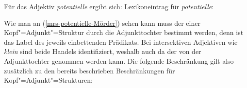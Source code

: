 Für das Adjektiv \emph{potentielle} ergibt sich:
\eas
Lexikoneintrag für \emph{potentielle}:\\
\zs

Wie man an (\ref{mrs-potentielle-Mörder}) sehen kann muss der \ltopw einer Kopf"=Adjunkt"=Struktur
durch die Adjunkttochter bestimmt werden, denn \ltop ist das Label des jeweils einbettenden
Prädikats. Bei intersektiven Adjektiven wie \emph{klein} sind beide Handels identifiziert, weshalb
auch da der \ltopw von der Adjunkttochter genommen werden kann. Die folgende Beschränkung gilt also
zusätzlich zu den bereits beschrieben Beschränkungen für Kopf"=Adjunkt"=Strukturen:
\ea
{} \impl
\z

